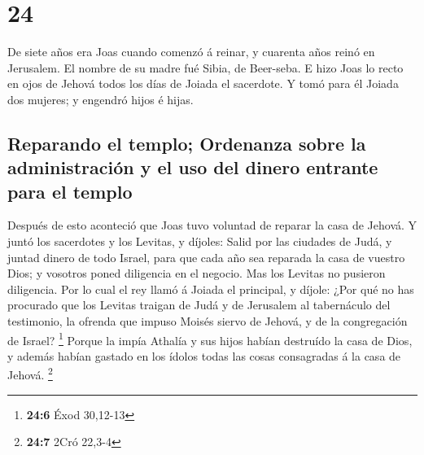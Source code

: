 \hypertarget{section-23}{%
\section{24}\label{section-23}}

 De siete años era Joas cuando comenzó á reinar, y cuarenta
años reinó en Jerusalem. El nombre de su madre fué Sibia, de Beer-seba.
 E hizo Joas lo recto en ojos de Jehová todos los días de
Joiada el sacerdote.  Y tomó para él Joiada dos mujeres; y
engendró hijos é hijas.

\hypertarget{reparando-el-templo-ordenanza-sobre-la-administraciuxf3n-y-el-uso-del-dinero-entrante-para-el-templo}{%
\subsection{Reparando el templo; Ordenanza sobre la administración y el
uso del dinero entrante para el
templo}\label{reparando-el-templo-ordenanza-sobre-la-administraciuxf3n-y-el-uso-del-dinero-entrante-para-el-templo}}

 Después de esto aconteció que Joas tuvo voluntad de reparar
la casa de Jehová.  Y juntó los sacerdotes y los Levitas, y
díjoles: Salid por las ciudades de Judá, y juntad dinero de todo Israel,
para que cada año sea reparada la casa de vuestro Dios; y vosotros poned
diligencia en el negocio. Mas los Levitas no pusieron diligencia.
 Por lo cual el rey llamó á Joiada el principal, y díjole:
¿Por qué no has procurado que los Levitas traigan de Judá y de Jerusalem
al tabernáculo del testimonio, la ofrenda que impuso Moisés siervo de
Jehová, y de la congregación de Israel? \footnote{\textbf{24:6} Éxod
  30,12-13}  Porque la impía Athalía y sus hijos habían
destruído la casa de Dios, y además habían gastado en los ídolos todas
las cosas consagradas á la casa de Jehová. \footnote{\textbf{24:7} 2Cró
  22,3-4}

